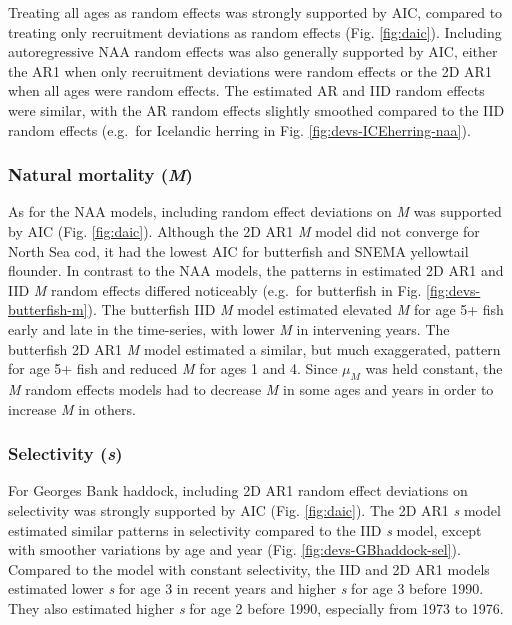 \documentclass[]{article}
\begin{document}
Treating all ages as random effects was strongly supported by AIC,
compared to treating only recruitment deviations as random effects (Fig.
\ref{fig:daic}). Including autoregressive NAA random effects was also
generally supported by AIC, either the AR1 when only recruitment
deviations were random effects or the 2D AR1 when all ages were random
effects. The estimated AR and IID random effects were similar, with the
AR random effects slightly smoothed compared to the IID random effects
(e.g.~for Icelandic herring in Fig. \ref{fig:devs-ICEherring-naa}).

\hypertarget{natural-mortality-m-1}{%
\subsubsection{\texorpdfstring{Natural mortality
(\emph{M})}{Natural mortality (M)}}\label{natural-mortality-m-1}}

As for the NAA models, including random effect deviations on \emph{M}
was supported by AIC (Fig. \ref{fig:daic}). Although the 2D AR1 \emph{M}
model did not converge for North Sea cod, it had the lowest AIC for
butterfish and SNEMA yellowtail flounder. In contrast to the NAA models,
the patterns in estimated 2D AR1 and IID \emph{M} random effects
differed noticeably (e.g.~for butterfish in Fig.
\ref{fig:devs-butterfish-m}). The butterfish IID \emph{M} model
estimated elevated \emph{M} for age 5+ fish early and late in the
time-series, with lower \emph{M} in intervening years. The butterfish 2D
AR1 \emph{M} model estimated a similar, but much exaggerated, pattern
for age 5+ fish and reduced \emph{M} for ages 1 and 4. Since \(\mu_M\)
was held constant, the \emph{M} random effects models had to decrease
\emph{M} in some ages and years in order to increase \emph{M} in others.

\hypertarget{selectivity-s-1}{%
\subsubsection{\texorpdfstring{Selectivity
(\emph{s})}{Selectivity (s)}}\label{selectivity-s-1}}

For Georges Bank haddock, including 2D AR1 random effect deviations on
selectivity was strongly supported by AIC (Fig. \ref{fig:daic}). The 2D
AR1 \emph{s} model estimated similar patterns in selectivity compared to
the IID \emph{s} model, except with smoother variations by age and year
(Fig. \ref{fig:devs-GBhaddock-sel}). Compared to the model with constant
selectivity, the IID and 2D AR1 models estimated lower \emph{s} for age
3 in recent years and higher \emph{s} for age 3 before 1990. They also
estimated higher \emph{s} for age 2 before 1990, especially from 1973 to
1976.
\end{document}
